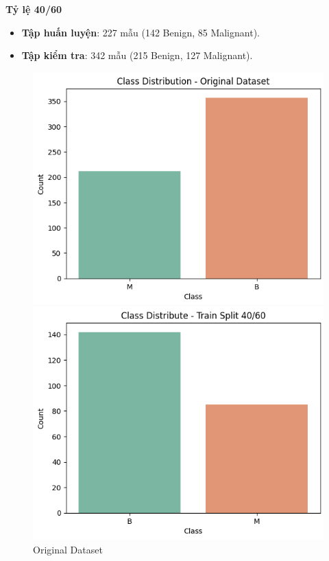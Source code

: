 \textbf{Tỷ lệ 40/60}

\begin{itemize}
	\item \textbf{Tập huấn luyện}: 227 mẫu (142 Benign, 85 Malignant).
	\item \textbf{Tập kiểm tra}: 342 mẫu (215 Benign, 127 Malignant).
\end{itemize}

\begin{figure}[h!]
	\centering
	\begin{minipage}[b]{0.32\linewidth}
		\centering
		\includegraphics[width=\linewidth]{figures/dataset1/1.1.png}
		\caption{Original Dataset}
		\label{fig:original}
	\end{minipage}%
	\hfill
	\begin{minipage}[b]{0.32\linewidth}
		\centering
		\includegraphics[width=\linewidth]{figures/dataset1/1.2.png}

\end{minipage}
\end{figure}
